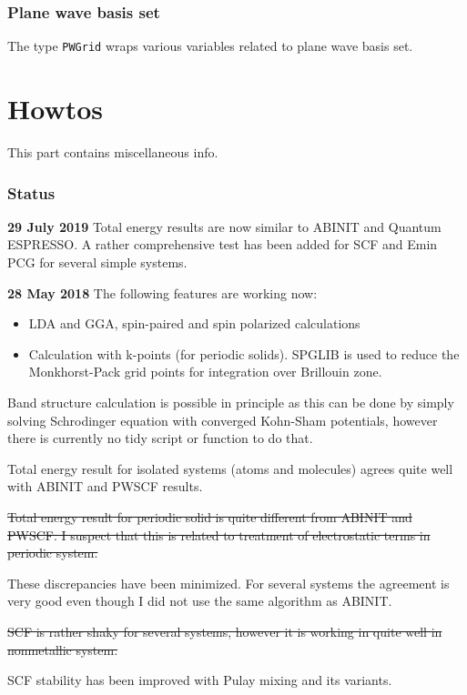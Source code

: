 \documentclass[a4paper,10pt]{article}
\newcommand{\jlinline}[1]{\texttt{#1}}
\begin{document}
\section{Plane wave basis set}

The type \jlinline{PWGrid} wraps various variables related to plane wave basis
set.




\part{Howtos}

This part contains miscellaneous info.




\section*{Status}

\textbf{29 July 2019} Total energy results are now similar to ABINIT
and Quantum ESPRESSO. A rather comprehensive test has been added
for SCF and Emin PCG for several simple systems.


\textbf{28 May 2018} The following features are working now:
\begin{itemize}
\item LDA and GGA, spin-paired and spin polarized calculations
\item Calculation with k-points (for periodic solids).
  \textsf{SPGLIB} is used to reduce the Monkhorst-Pack grid points
  for integration over Brillouin zone.
\end{itemize}

Band structure calculation is possible in principle as this can be
done by simply solving
Schrodinger equation with converged Kohn-Sham potentials, however there
is currently no tidy script or function to do that.

Total energy result for isolated systems (atoms and molecules) agrees quite
well with ABINIT and PWSCF results.

\sout{Total energy result for periodic solid is quite different from ABINIT and PWSCF.
I suspect that this is related to treatment of electrostatic terms in periodic system.}

These discrepancies have been minimized. For several systems the agreement is very good
even though I did not use the same algorithm as ABINIT.

\sout{SCF is rather shaky for several systems, however it is working in quite well in nonmetallic
system.}

SCF stability has been improved with Pulay mixing and its variants.
\end{document}
